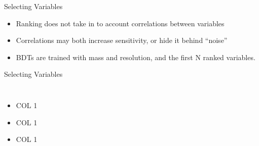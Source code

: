 \documentclass[t]{beamer}
\begin{document}
\begin{frame}{Selecting Variables}
  \begin{itemize}  
    \item Ranking does not take in to account correlations between variables
    \item Correlations may both increase sensitivity, or hide it behind
``noise''
    \item BDTs are trained with mass and resolution, and the first N ranked
variables.
  \end{itemize}
\end{frame}

\begin{frame}{Selecting Variables}
  \begin{columns}[c]
  \begin{itemize}
   \item COL 1
   \item COL 1
   \item COL 1
   \end{itemize}
  \end{columns}
\end{frame}
\end{document}
